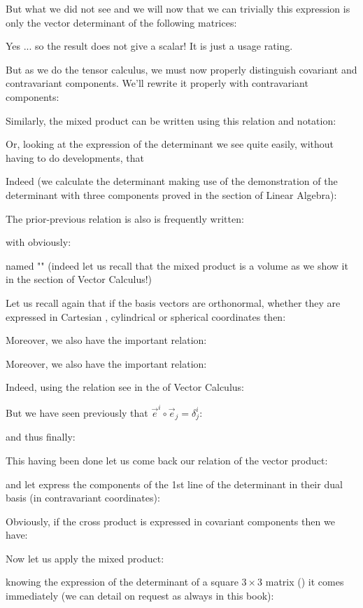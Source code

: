 	But what we did not see and we will now that we can trivially this expression is only the vector determinant of the following matrices:
	
	Yes ... so the result does not give a scalar! It is just a usage rating.
	
	But as we do the tensor calculus, we must now properly distinguish covariant and contravariant components. We'll rewrite it properly with contravariant components:
	
	Similarly, the mixed product can be written using this relation and notation:
	
	Or, looking at the expression of the determinant we see quite easily, without having to do developments, that
	
	Indeed (we calculate the determinant making use of the demonstration of the determinant with three components proved in the section of Linear Algebra):
	
	The prior-previous relation is also is frequently written:
	
	with obviously:
	
	named "" (indeed let us recall that the mixed product is a volume as we show it in the section of Vector Calculus!)
	\begin{tcolorbox}[title=Remark,colframe=black,arc=10pt]
	Let us recall again that if the basis vectors are orthonormal, whether they are expressed in Cartesian , cylindrical or spherical coordinates then:
	
	\end{tcolorbox}
	Moreover, we also have the important relation:
	
	Moreover, we also have the important relation:
	
	Indeed, using the relation see in the of Vector Calculus:
	
	But we have seen previously that $\vec{e}^i\circ\vec{e}_j=\delta_j^i$:
	
	and thus finally:
	
	This having been done let us come back our relation of the vector product:
	
	and let express the components of the 1st line of the determinant in their dual basis (in contravariant coordinates):
	
	Obviously, if the cross product is expressed in covariant components then we have:
	
	Now let us apply the mixed product:
	
	knowing the expression of the determinant of a square $3\times 3$ matrix  () it comes immediately (we can detail on request as always in this book):
	
